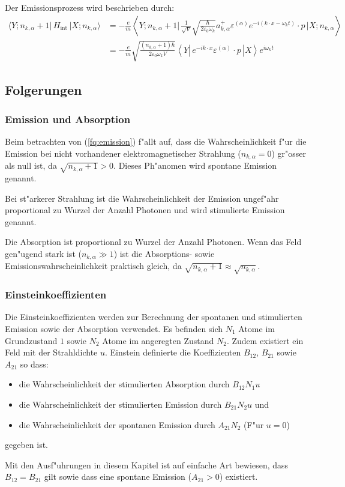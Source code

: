 Der Emissionsprozess wird beschrieben durch:
\begin{equation} \label{fq:emission}
\begin{split}
\langle Y; n_{k,\alpha} + 1 |\, H_{\text{int}} \,| X; n_{k,\alpha} \rangle &= 
-\frac{e}{m} \left\langle Y; n_{k,\alpha} + 1 \biggl| 
\, \frac{1}{\sqrt{V}} \sqrt{\frac{\hbar}{2 \varepsilon_0 \omega_k}}a^+_{k,\alpha} \varepsilon^{(\alpha)} e^{-i(k \cdot x-\omega_k t)} \cdot p \,
\biggl| X; n_{k,\alpha} \right\rangle\\
&= -\frac{e}{m} \sqrt{\frac{ (n_{k,\alpha}+1) \hbar}{2 \varepsilon_0 \omega_k V}} \left\langle Y \left| 
\, e^{-ik \cdot x} \varepsilon^{(\alpha)} \cdot p \,
\right| X \right\rangle e^{i\omega_k t}
\end{split}
\end{equation}

\subsection{Folgerungen}
\subsubsection{Emission und Absorption}
Beim betrachten von (\ref{fq:emission}) f"allt auf, dass die Wahrscheinlichkeit f"ur die Emission bei nicht vorhandener elektromagnetischer Strahlung ($n_{k,\alpha} = 0$) gr"osser als null ist, da $\sqrt{n_{k,\alpha}+1} > 0$. Dieses Ph"anomen wird spontane Emission genannt.

Bei st"arkerer Strahlung ist die Wahrscheinlichkeit der Emission ungef"ahr proportional zu Wurzel der Anzahl Photonen und wird stimulierte Emission genannt.

Die Absorption ist proportional zu Wurzel der Anzahl Photonen. Wenn das Feld gen"ugend stark ist ($n_{k,\alpha} \gg 1$) ist die Absorptions- sowie Emissionswahrscheinlichkeit praktisch gleich, da $\sqrt{n_{k,\alpha}+1} \approx \sqrt{n_{k,\alpha}}$. 

\subsubsection{Einsteinkoeffizienten}
Die Einsteinkoeffizienten \cite{fq:einstein_koeff} werden zur Berechnung der spontanen und stimulierten Emission sowie der Absorption verwendet. Es befinden sich $N_1$ Atome im Grundzustand $1$ sowie $N_2$ Atome im angeregten Zustand $N_2$. Zudem existiert ein Feld mit der Strahldichte $u$. Einstein definierte die Koeffizienten $B_{12}$, $B_{21}$ sowie $A_{21}$ so dass:
\begin{itemize}
	\item die Wahrscheinlichkeit der stimulierten Absorption durch $B_{12} N_1 u$
	\item die Wahrscheinlichkeit der stimulierten Emission durch $B_{21} N_2 u$ und
	\item die Wahrscheinlichkeit der spontanen Emission durch $A_{21} N_2$ (F"ur $u=0$)
\end{itemize}
gegeben ist.

Mit den Ausf"uhrungen in diesem Kapitel ist auf einfache Art bewiesen, dass $B_{12} = B_{21}$ gilt sowie dass eine spontane Emission ($A_{21} > 0$) existiert.